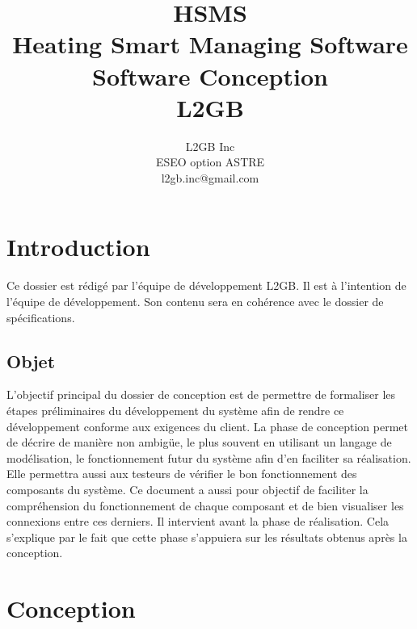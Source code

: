 \documentclass[11pt,a4paper]{report} %
\author{L2GB Inc\\
		ESEO option ASTRE\\
		l2gb.inc@gmail.com
		}
\title{HSMS\\Heating Smart Managing Software  \\Software Conception\\L2GB}
\newcommand{\sommaire}{\shorttoc{Sommaire}{1}}
\begin{document}

\maketitle %
\sommaire %

	\chapter{Introduction}
Ce dossier est rédigé par l’équipe de développement L2GB. Il est à l’intention de l’équipe de développement. Son contenu sera en cohérence avec le dossier de spécifications. 
		\section{Objet}
		
L’objectif principal du dossier de conception est de permettre de formaliser les étapes préliminaires du développement du système afin de rendre ce développement conforme aux exigences du client. La phase de conception permet de décrire de manière non ambigüe, le plus souvent en utilisant un langage de modélisation, le fonctionnement futur du système afin d’en faciliter sa réalisation. Elle permettra aussi aux testeurs de vérifier le bon fonctionnement des composants du système. Ce document a aussi pour objectif de faciliter la compréhension du fonctionnement de chaque composant et de bien visualiser les connexions entre ces derniers. Il intervient avant la phase de réalisation. Cela s'explique par le fait que cette phase s’appuiera sur les résultats obtenus après la conception.
\newpage


		\chapter{Conception}
\end{document}
